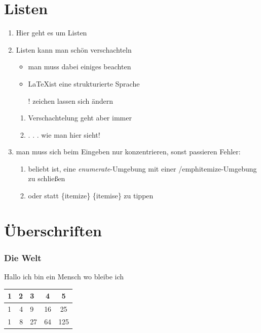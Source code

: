 \documentclass[]{scrartcl}
\begin{document}
\section{Listen}

\begin{enumerate}[]
	\item  Hier geht es um Listen
	\item Listen kann man schön verschachteln
    	\begin{itemize}
    	\item man muss dabei einiges beachten \label{Ich bin Faul}
		\item \LaTeX ist eine strukturierte Sprache
		\item[!] zeichen lassen sich ändern
		\end{itemize}

		\begin{enumerate}[label=(\alph*)]
        \item Verschachtelung geht aber immer
        \item . . . wie man hier sieht!
		\end{enumerate}
      \item man muss sich beim Eingeben nur konzentrieren, sonst passieren Fehler:
      	\begin{enumerate}[label=(\roman*)]
		\item beliebt ist, eine \emph{enumerate}-Umgebung mit einer /emph{itemize}-Umgebung zu schließen
        \item oder statt \{itemize\} \{itemise\} zu tippen
		\end{enumerate}
	\end{enumerate}

\section{\"Uberschriften}
\subsubsection{Die Welt}
Hallo ich bin ein Mensch wo bleibe ich \label{Hallo Welt}

\begin{table}[h] \centering
\begin{tabular}{|l|r|p{3.14cm}|c|c|}\hline
1 & 2 & 3 & 4 & 5 \\ \hline
1 & 4 & 9 & 16 & 25 \\ \hline
1 & 8 & 27 & 64 & 125 \\ \hline
\end{tabular}
\end{table}
\end{document}
